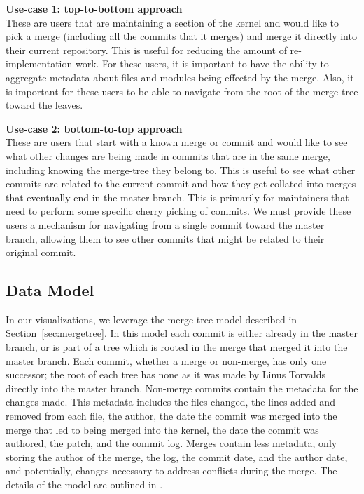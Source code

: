 \documentclass[draft]{IEEEtran}
\begin{document}
\noindent \textbf{Use-case 1: top-to-bottom
  approach}\label{sec:usecase1}\\ These are users that are maintaining a
section of the kernel and would like to pick a merge (including all the
commits that it merges) and merge it directly into their current
repository. This is useful for reducing the amount of re-implementation
work. For these users, it is important to have the ability to aggregate
metadata about files and modules being effected by the merge. Also, it
is important for these users to be able to navigate from the root of the
merge-tree toward the leaves.

\noindent \textbf{Use-case 2: bottom-to-top
  approach}\label{sec:usecase2}\\ These are users that start with a
known merge or commit and would like to see what other changes are being
made in commits that are in the same merge, including knowing the
merge-tree they belong to. This is useful to see what other commits are
related to the current commit and how they get collated into merges that
eventually end in the master branch. This is primarily for maintainers
that need to perform some specific cherry picking of commits. We must
provide these users a mechanism for navigating from a single commit
toward the master branch, allowing them to see other commits that might
be related to their original commit.

\subsection{Data Model}

In our visualizations, we leverage the merge-tree model described in
Section~\ref{sec:mergetree}. In this model each commit is either already
in the master branch, or is part of a tree which is rooted in the merge
that merged it into the master branch.  Each commit, whether a merge or
non-merge, has only one successor; the root of each tree has none as it
was made by Linus Torvalds directly into the master branch. Non-merge
commits contain the metadata for the changes made.  This metadata
includes the files changed, the lines added and removed from each file,
the author, the date the commit was merged into the merge that led to
being merged into the kernel, the date the commit was authored, the
patch, and the commit log. Merges contain less metadata, only storing
the author of the merge, the log, the commit date, and the author date,
and potentially, changes necessary to address conflicts during the
merge. The details of the model are outlined in \cite{German2015}.
\end{document}
